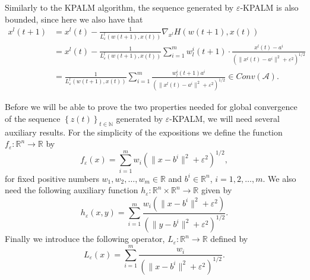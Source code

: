 \documentclass[11pt]{article}
\numberwithin{equation}{section}
\begin{document}
Similarly to the KPALM algorithm, the sequence generated by $\varepsilon$-KPALM is also bounded, since here we also have that
\begin{equation*}
\begin{aligned}
	x^l(t+1) &= x^l(t) - \frac{1}{L^l_{\varepsilon}(w(t+1),x(t))} \nabla_{x^l} H(w(t+1),x(t)) \\
	&= x^l(t) - \frac{1}{L^l_{\varepsilon}(w(t+1),x(t))} \sum\limits_{i=1}^{m} w^i_l(t+1) \cdot \frac{x^l(t) - a^i}{\left( \|x^l(t) - a^i\|^2 + {\varepsilon}^2 \right)^{1/2}} \\
	&= \frac{1}{L^l_{\varepsilon}(w(t+1),x(t))} \sum\limits_{i=1}^{m} \frac{w^i_l(t+1) a^i}{\left( \|x^l(t) - a^i\|^2 + {\varepsilon}^2 \right)^{1/2}} \in Conv(\mathcal{A}).
\end{aligned}
\end{equation*}

Before we will be able to prove the two properties needed for global convergence of the sequence $\left\lbrace z(t) \right\rbrace_{t \in \mathbb{N}}$ generated by $\varepsilon$-KPALM, we will need several auxiliary results. For the simplicity of the expositions we define the  function $f_{\varepsilon}: \mathbb{R}^n \rightarrow \mathbb{R}$ by
\begin{equation*}
	f_{\varepsilon}(x) = \sum\limits_{i=1}^{m} w_i \left( \|x - b^i\|^2 + {\varepsilon}^2 \right)^{1/2},
\end{equation*}
for fixed positive numbers $w_1,w_2, \ldots, w_m \in \mathbb{R}$ and $b^i \in \mathbb{R}^n$, $i=1,2, \ldots, m$. We also need the following auxiliary function $h_{\varepsilon}: \mathbb{R}^n \times \mathbb{R}^n \rightarrow \mathbb{R}$ given by
\begin{equation*}
	h_{\varepsilon}(x,y) = \sum\limits_{i=1}^m \frac{w_i \left( \|x-b^i\|^2 + {\varepsilon}^2 \right)}{\left( \|y-b^i\|^2 + {\varepsilon}^2 \right)^{1/2}} .
\end{equation*}
Finally we introduce the following operator, $L_{\varepsilon}: \mathbb{R}^n \rightarrow \mathbb{R}$ defined by
\begin{equation*}
	L_{\varepsilon}(x) = \sum\limits_{i=1}^{m}\frac{w_i}{\left( \|x - b^i\|^2 + {\varepsilon}^2 \right)^{1/2}} .
\end{equation*}
\end{document}
